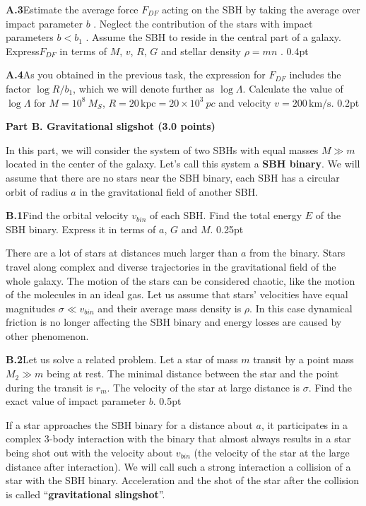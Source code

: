 \textbf{A.3}\quad Estimate the average force $F_{DF}$ acting on the SBH by
taking the average over impact parameter $b$ . Neglect the contribution of the
stars with impact parameters $b < b_1$ . Assume the SBH to reside in the
central part of a galaxy. Express$F_{DF}$ in terms of $M$, $v$, $R$, $G$ and
stellar density $\rho = mn$ . \hfill 0.4pt

\textbf{A.4}\quad As you obtained in the previous task, the expression for
$F_{DF}$ includes the factor $\log R/b_1$, which we will denote further as
$\log\Lambda$. Calculate the value of $\log\Lambda$ for
$M = 10^8\ M_S$, $R = 20\,\mathrm{kpc} = 20 \times 10^3\ pc$ and velocity
$v = 200\,\mathrm{km/s}$. \hfill 0.2pt

\textbf{Part B. Gravitational sligshot (3.0 points)}

In this part, we will consider the system of two SBHs with equal masses
$M \gg m$ located in the center of the galaxy. Let's call this system a
\textbf{SBH binary}. We will assume that there are no stars near the SBH
binary, each SBH has a circular orbit of radius $a$ in the gravitational field
of another SBH.

\textbf{B.1}\quad Find the orbital velocity $v_{bin}$ of each SBH. Find the
total energy $E$ of the SBH binary. Express it in terms of $a$, $G$ and $M$.
\hfill 0.25pt

There are a lot of stars at distances much larger than $a$ from the binary.
Stars travel along complex and diverse trajectories in the gravitational field
of the whole galaxy. The motion of the stars can be considered chaotic, like
the motion of the molecules in an ideal gas. Let us assume that stars'
velocities have equal magnitudes $\sigma \ll v_{bin}$ and their average mass
density is $\rho$. In this case dynamical friction is no longer affecting the
SBH binary and energy losses are caused by other phenomenon.

\textbf{B.2}\quad Let us solve a related problem. Let a star of mass $m$
transit by a point mass $M_2 \gg m$ being at rest. The minimal distance between
the star and the point during the transit is $r_m$. The velocity of the star at
large distance is $\sigma$. Find the exact value of impact parameter $b$.
\hfill 0.5pt

If a star approaches the SBH binary for a distance about $a$, it participates
in a complex 3-body interaction with the binary that almost always results in a
star being shot out with the velocity about $v_{bin}$ (the velocity of the star
at the large distance after interaction). We will call such a strong
interaction a collision of a star with the SBH binary. Acceleration and the
shot of the star after the collision is called ``\textbf{gravitational
slingshot}''.


